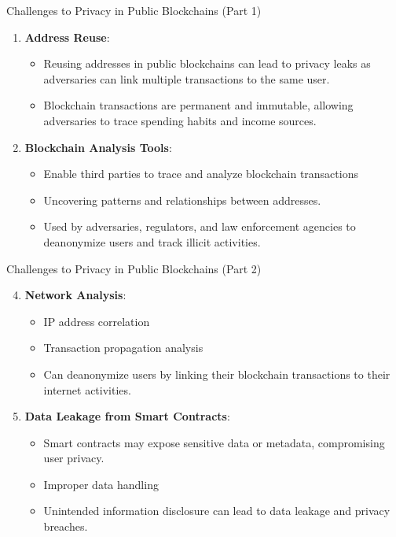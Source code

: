 \begin{withoutheadline}
\begin{frame}{Challenges to Privacy in Public Blockchains (Part 1)}
\begin{enumerate}
        \item \textbf{Address Reuse}:
            \begin{itemize}
                \item Reusing addresses in public blockchains can lead to privacy leaks as adversaries can link multiple transactions to the same user.
                \item Blockchain transactions are permanent and immutable, allowing adversaries to trace spending habits and income sources.
            \end{itemize}
        
        \item \textbf{Blockchain Analysis Tools}:
            \begin{itemize}
                \item Enable third parties to trace and analyze blockchain transactions
                \item Uncovering patterns and relationships between addresses.
                \item Used by adversaries, regulators, and law enforcement agencies to deanonymize users and track illicit activities.
            \end{itemize}
    \end{enumerate}
\end{frame}

\begin{frame}{Challenges to Privacy in Public Blockchains (Part 2)}
    \begin{enumerate}
        \setcounter{enumi}{3}
        \item \textbf{Network Analysis}:
            \begin{itemize}
                \item IP address correlation
                \item Transaction propagation analysis
                \item Can deanonymize users by linking their blockchain transactions to their internet activities.
            \end{itemize}
        
        \item \textbf{Data Leakage from Smart Contracts}:
            \begin{itemize}
                \item Smart contracts may expose sensitive data or metadata, compromising user privacy.
                \item Improper data handling
                \item Unintended information disclosure can lead to data leakage and privacy breaches.
            \end{itemize}
        

\end{enumerate}
\end{frame}
\end{withoutheadline}
